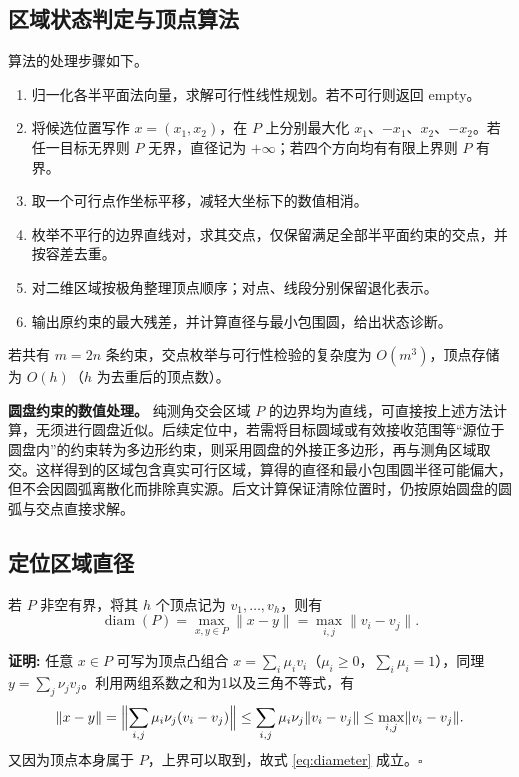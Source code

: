 \documentclass[UTF8,a4paper,zihao=-4,fontset=none]{ctexart}
\begin{document}
\subsection{区域状态判定与顶点算法}

算法的处理步骤如下。

\begin{enumerate}[label=(\arabic*),leftmargin=2.2em]
  \item 归一化各半平面法向量，求解可行性线性规划。若不可行则返回 empty。
  \item 将候选位置写作 \(x=(x_1,x_2)\)，在 \(P\) 上分别最大化 \(x_1\)、\(-x_1\)、\(x_2\)、\(-x_2\)。若任一目标无界则 \(P\) 无界，直径记为 \(+\infty\)；若四个方向均有有限上界则 \(P\) 有界。
  \item 取一个可行点作坐标平移，减轻大坐标下的数值相消。
  \item 枚举不平行的边界直线对，求其交点，仅保留满足全部半平面约束的交点，并按容差去重。
  \item 对二维区域按极角整理顶点顺序；对点、线段分别保留退化表示。
  \item 输出原约束的最大残差，并计算直径与最小包围圆，给出状态诊断。
\end{enumerate}

若共有 \(m=2n\) 条约束，交点枚举与可行性检验的复杂度为 \(O(m^3)\)，顶点存储为 \(O(h)\)（\(h\) 为去重后的顶点数）。

\textbf{圆盘约束的数值处理。} 纯测角交会区域 \(P\) 的边界均为直线，可直接按上述方法计算，无须进行圆盘近似。后续定位中，若需将目标圆域或有效接收范围等“源位于圆盘内”的约束转为多边形约束，则采用圆盘的外接正多边形，再与测角区域取交。这样得到的区域包含真实可行区域，算得的直径和最小包围圆半径可能偏大，但不会因圆弧离散化而排除真实源。后文计算保证清除位置时，仍按原始圆盘的圆弧与交点直接求解。

\subsection{定位区域直径}

若 \(P\) 非空有界，将其 \(h\) 个顶点记为 \(v_1,\dots,v_h\)，则有
\begin{equation}
  \operatorname{diam}(P)=\max_{x,y\in P}\lVert x-y\rVert=\max_{i,j}\lVert v_i-v_j\rVert .
  \label{eq:diameter}
\end{equation}

\textbf{证明:} 任意 \(x\in P\) 可写为顶点凸组合 \(x=\sum_i\mu_iv_i\)（\(\mu_i\ge0\)，\(\sum_i\mu_i=1\)），同理 \(y=\sum_j\nu_jv_j\)。利用两组系数之和为1以及三角不等式，有
\begin{equation}
  \lVert x-y\rVert
  =\Bigl\lVert\sum_{i,j}\mu_i\nu_j(v_i-v_j)\Bigr\rVert
  \le\sum_{i,j}\mu_i\nu_j\lVert v_i-v_j\rVert
  \le\max_{i,j}\lVert v_i-v_j\rVert .
\end{equation}
又因为顶点本身属于 \(P\)，上界可以取到，故式 \eqref{eq:diameter} 成立。\(\square\) 
\end{document}
